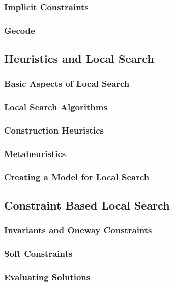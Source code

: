 \documentclass[a4paper,11pt]{article}
\begin{document}
    \subsubsection{Implicit Constraints}
    
    \subsubsection{Gecode}
    
  \subsection{Heuristics and Local Search}
  
     \subsubsection{Basic Aspects of Local Search}
    
    \subsubsection{Local Search Algorithms}
     \label{sub_lsalg}
    \subsubsection{Construction Heuristics}
    
    \subsubsection{Metaheuristics}
    
    \subsubsection{Creating a Model for Local Search}
    
  \subsection{Constraint Based Local Search}
  
    \subsubsection{Invariants and Oneway Constraints}
    
    \subsubsection{Soft Constraints}
    
    \subsubsection{Evaluating Solutions}
    
\end{document}
